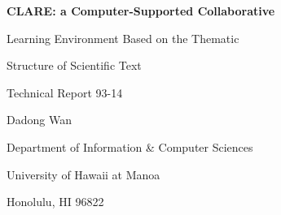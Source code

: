 

\thispagestyle{empty}

\begin{center}
  
  \vspace*{0.2in}
  
  {\Large\bf CLARE: a Computer-Supported Collaborative

             \medskip
  
             Learning Environment Based on the Thematic

             \medskip
  
             Structure of Scientific Text}
  
  \vspace*{1.0in}

  Technical Report 93-14
  
  \vspace*{1.0in}

  Dadong Wan

  \vspace*{1.0in}
  
  Department of Information \& Computer Sciences
  
  University of Hawaii at Manoa

  Honolulu, HI 96822

  
\end{center}

